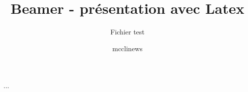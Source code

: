 \documentclass[t,12pt]{beamer}
\title{Beamer - présentation avec Latex}
\subtitle{Fichier test}
\author{mcclinews}
\date{\oldstylenums{Mai 2007}}
\begin{document}
 ...
 
\end{document}
